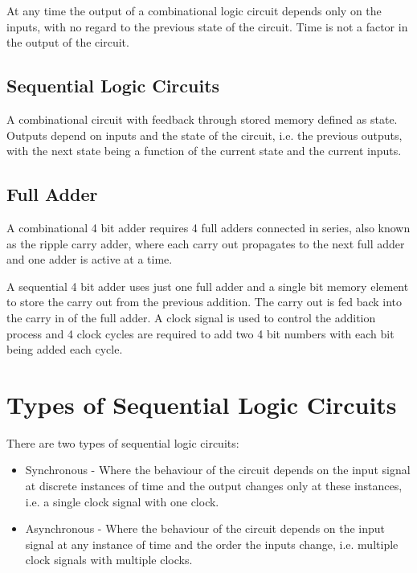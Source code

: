 \documentclass[12pt letter]{report}
\begin{document}
At any time the output of a combinational logic circuit depends only on the inputs, with no regard to the previous state
of the circuit. Time is not a factor in the output of the circuit.

\subsection{Sequential Logic Circuits}

A combinational circuit with feedback through stored memory defined as state. Outputs depend on inputs and the state of
the circuit, i.e. the previous outputs, with the next state being a function of the current state and the current
inputs.

\subsection{Full Adder}


A combinational 4 bit adder requires 4 full adders connected in series, also known as the ripple carry adder, where each
carry out propagates to the next full adder and one adder is active at a time.

%
%


A sequential 4 bit adder uses just one full adder and a single bit memory element to store the carry out from the
previous addition. The carry out is fed back into the carry in of the full adder. A clock signal is used to control the
addition process and 4 clock cycles are required to add two 4 bit numbers with each bit being added each cycle.

\section{Types of Sequential Logic Circuits}

There are two types of sequential logic circuits:
\begin{itemize}
  \item Synchronous - Where the behaviour of the circuit depends on the input signal at discrete instances of time and
        the output changes only at these instances, i.e. a single clock signal with one clock.
  \item Asynchronous - Where the behaviour of the circuit depends on the input signal at any instance of time and
        the order the inputs change, i.e. multiple clock signals with multiple clocks.
\end{itemize}
\end{document}
